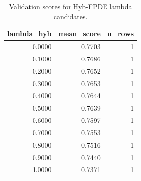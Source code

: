 \begin{table}[t]
\caption{Validation scores for Hyb-FPDE lambda candidates.}
\label{tab:lambda_distribution_computed}
\centering
\begin{tabular}{rrr}
\toprule
lambda\_hyb & mean\_score & n\_rows \\
\midrule
0.0000 & 0.7703 & 1 \\
0.1000 & 0.7686 & 1 \\
0.2000 & 0.7652 & 1 \\
0.3000 & 0.7653 & 1 \\
0.4000 & 0.7644 & 1 \\
0.5000 & 0.7639 & 1 \\
0.6000 & 0.7597 & 1 \\
0.7000 & 0.7553 & 1 \\
0.8000 & 0.7516 & 1 \\
0.9000 & 0.7440 & 1 \\
1.0000 & 0.7371 & 1 \\
\bottomrule
\end{tabular}

\end{table}

